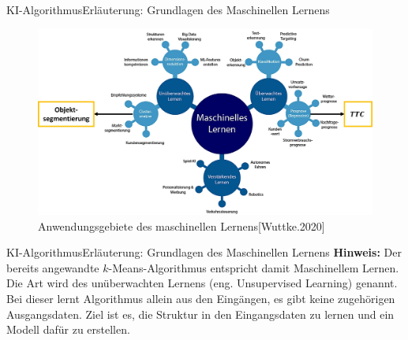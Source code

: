 \documentclass[169, handout	]{THIbeamer} %
\begin{document}
    \begin{frame}{KI-Algorithmus}{Erläuterung: Grundlagen des Maschinellen Lernens}
		\begin{figure}
			\includegraphics[scale=0.4]{required/Bereiche_Machine_Learning.jpg}
			\caption{Anwendungsgebiete des maschinellen Lernens[Wuttke.2020]}
        	\label{Ground Subtraction}
       	\end{figure}
     
    \end{frame}
    \begin{frame}{KI-Algorithmus}{Erläuterung: Grundlagen des Maschinellen Lernens}
		\vspace{1cm}       	
       	\textbf{Hinweis:} Der bereits angewandte $k$-Means-Algorithmus entspricht damit Maschinellem Lernen. Die Art wird des unüberwachten Lernens (eng. Unsupervised Learning) genannt. Bei dieser lernt Algorithmus allein aus den Eingängen, es gibt keine zugehörigen Ausgangsdaten. Ziel ist es, die Struktur in den Eingangsdaten zu lernen und ein Modell dafür zu erstellen.
	\end{frame}
\end{document}

